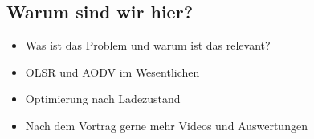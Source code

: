 \documentclass[11pt,handout,notes=only]{beamer}
\begin{document}




\subsection{Warum sind wir hier?}

\begin{frame}{\insertsubsection}
\begin{itemize}
\item Was ist das Problem und warum ist das relevant?\newline
\item OLSR und AODV im Wesentlichen\newline
\item Optimierung nach Ladezustand\newline
\item Nach dem Vortrag gerne mehr Videos und Auswertungen
\end{itemize}
\end{frame}
\end{document}

